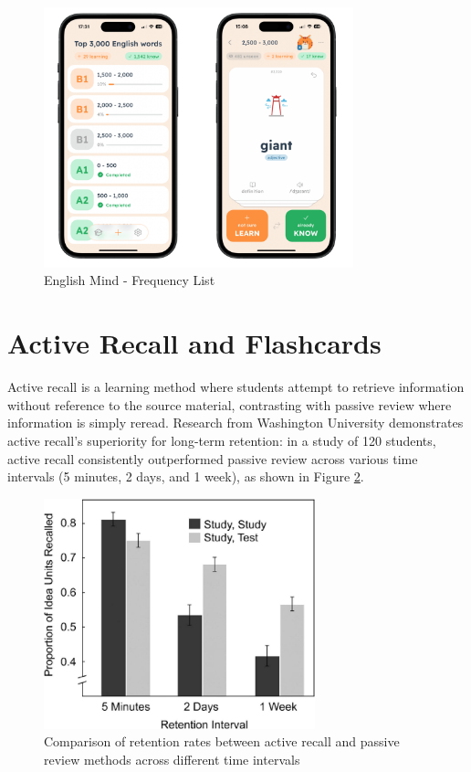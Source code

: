 \begin{figure}[!h]
    \includegraphics[width=0.8\textwidth]{src/figures/em-frequency-list.png}
    \caption{English Mind - Frequency List}
    \label{fig:em-frequency-list}
\end{figure}

\section{Active Recall and Flashcards}
\label{sec:em-active-recall}

Active recall is a learning method where students attempt to retrieve information without reference to the source material, contrasting with passive review where information is simply reread. Research from Washington University \cite{cite:rhkj2006_longterm_retention} demonstrates active recall's superiority for long-term retention: in a study of 120 students, active recall consistently outperformed passive review across various time intervals (5 minutes, 2 days, and 1 week), as shown in Figure \ref{fig:active-recall-passive-review-results}.

\begin{figure}[!h]
    \includegraphics[width=0.7\textwidth]{src/figures/active-recall-passive-review-results.jpeg}
    \caption{Comparison of retention rates between active recall and passive review methods across different time intervals \cite{cite:rhkj2006_longterm_retention}}
    \label{fig:active-recall-passive-review-results}
\end{figure}

